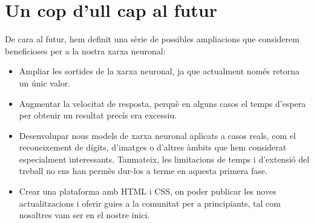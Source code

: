 \section{Un cop d'ull cap al futur}

De cara al futur, hem definit una sèrie de possibles ampliacions que considerem beneficioses per a la nostra xarxa neuronal:

\begin{itemize}

\item Ampliar les sortides de la xarxa neuronal, ja que actualment només retorna un únic valor.

\item Augmentar la velocitat de resposta, perquè en alguns casos el temps d’espera per obtenir un resultat precís era excessiu.

\item Desenvolupar nous models de xarxa neuronal aplicats a casos reals, com el reconeixement de dígits, d’imatges o d’altres àmbits que hem considerat especialment interessants. Tanmateix, les limitacions de temps i d’extensió del treball no ens han permès dur-los a terme en aquesta primera fase.

\item Crear una plataforma amb HTML\cite{HTML} i CSS\cite{CSS}, on poder publicar les noves actualitzacions i oferir guies a la comunitat per a principiants, tal com nosaltres vam ser en el nostre inici.

\end{itemize}


